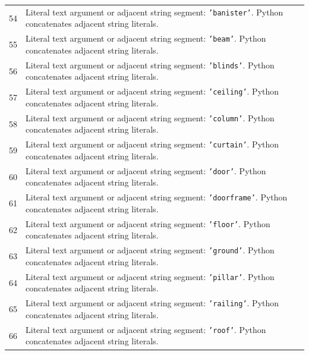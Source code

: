 \documentclass[11pt,a4paper]{book}
\begin{document}
\begin{longtable}{r p{}}
54 & Literal text argument or adjacent string segment: \texttt{'banister'}. Python concatenates adjacent string literals. \\

55 & Literal text argument or adjacent string segment: \texttt{'beam'}. Python concatenates adjacent string literals. \\

56 & Literal text argument or adjacent string segment: \texttt{'blinds'}. Python concatenates adjacent string literals. \\

57 & Literal text argument or adjacent string segment: \texttt{'ceiling'}. Python concatenates adjacent string literals. \\

58 & Literal text argument or adjacent string segment: \texttt{'column'}. Python concatenates adjacent string literals. \\

59 & Literal text argument or adjacent string segment: \texttt{'curtain'}. Python concatenates adjacent string literals. \\

60 & Literal text argument or adjacent string segment: \texttt{'door'}. Python concatenates adjacent string literals. \\

61 & Literal text argument or adjacent string segment: \texttt{'doorframe'}. Python concatenates adjacent string literals. \\

62 & Literal text argument or adjacent string segment: \texttt{'floor'}. Python concatenates adjacent string literals. \\

63 & Literal text argument or adjacent string segment: \texttt{'ground'}. Python concatenates adjacent string literals. \\

64 & Literal text argument or adjacent string segment: \texttt{'pillar'}. Python concatenates adjacent string literals. \\

65 & Literal text argument or adjacent string segment: \texttt{'railing'}. Python concatenates adjacent string literals. \\

66 & Literal text argument or adjacent string segment: \texttt{'roof'}. Python concatenates adjacent string literals. \\


\end{longtable}
\end{document}
